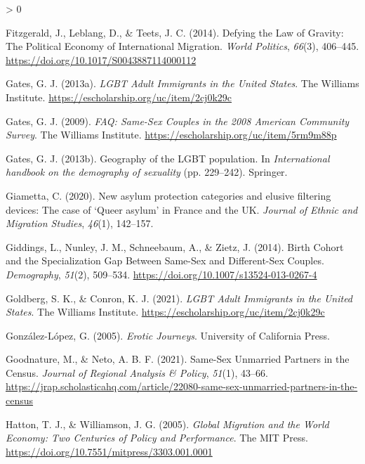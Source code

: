 \documentclass[
  11pt,
]{article}
\newlength{\cslhangindent}
\newenvironment{CSLReferences}[2] %
 {%
  \setlength{\parindent}{0pt}
  \ifodd #1 \everypar{\setlength{\hangindent}{\cslhangindent}}\ignorespaces\fi
  \ifnum #2 > 0
  \setlength{\parskip}{#2\baselineskip}
  \fi
 }%
 {}
\begin{document}
\begin{CSLReferences}{1}{0}
\leavevmode\hypertarget{ref-fitzgerald_2014}{}%
Fitzgerald, J., Leblang, D., \& Teets, J. C. (2014). Defying the {Law} of {Gravity}: {The} {Political} {Economy} of {International} {Migration}. \emph{World Politics}, \emph{66}(3), 406--445. \url{https://doi.org/10.1017/S0043887114000112}

\leavevmode\hypertarget{ref-gates_2013}{}%
Gates, G. J. (2013a). \emph{{LGBT} {Adult} {Immigrants} in the {United} {States}}. The Williams Institute. \url{https://escholarship.org/uc/item/2cj0k29c}

\leavevmode\hypertarget{ref-gates_2009a}{}%
Gates, G. J. (2009). \emph{{FAQ}: {Same}-{Sex} {Couples} in the 2008 {American} {Community} {Survey}}. The Williams Institute. \url{https://escholarship.org/uc/item/5rm9m88p}

\leavevmode\hypertarget{ref-gates_2013a}{}%
Gates, G. J. (2013b). Geography of the {LGBT} population. In \emph{International handbook on the demography of sexuality} (pp. 229--242). Springer.

\leavevmode\hypertarget{ref-giametta_2020}{}%
Giametta, C. (2020). New asylum protection categories and elusive filtering devices: The case of {`{Queer} asylum'} in {France} and the {UK}. \emph{Journal of Ethnic and Migration Studies}, \emph{46}(1), 142--157.

\leavevmode\hypertarget{ref-giddings_2014}{}%
Giddings, L., Nunley, J. M., Schneebaum, A., \& Zietz, J. (2014). Birth {Cohort} and the {Specialization} {Gap} {Between} {Same}-{Sex} and {Different}-{Sex} {Couples}. \emph{Demography}, \emph{51}(2), 509--534. \url{https://doi.org/10.1007/s13524-013-0267-4}

\leavevmode\hypertarget{ref-goldberg_2021}{}%
Goldberg, S. K., \& Conron, K. J. (2021). \emph{{LGBT} {Adult} {Immigrants} in the {United} {States}}. The Williams Institute. \url{https://escholarship.org/uc/item/2cj0k29c}

\leavevmode\hypertarget{ref-gonzalez-lopez_2005}{}%
González-López, G. (2005). \emph{Erotic {Journeys}}. University of California Press.

\leavevmode\hypertarget{ref-goodnature_2021}{}%
Goodnature, M., \& Neto, A. B. F. (2021). Same-{Sex} {Unmarried} {Partners} in the {Census}. \emph{Journal of Regional Analysis \& Policy}, \emph{51}(1), 43--66. \url{https://jrap.scholasticahq.com/article/22080-same-sex-unmarried-partners-in-the-census}

\leavevmode\hypertarget{ref-hatton_2005a}{}%
Hatton, T. J., \& Williamson, J. G. (2005). \emph{Global {Migration} and the {World} {Economy}: {Two} {Centuries} of {Policy} and {Performance}}. The MIT Press. \url{https://doi.org/10.7551/mitpress/3303.001.0001}


\end{CSLReferences}
\end{document}
